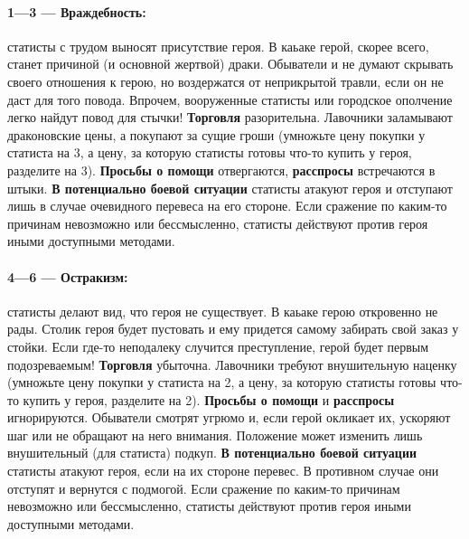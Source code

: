 \paragraph{1—3 — Враждебность:} статисты с трудом выносят присутствие героя. В каьаке герой, скорее всего, станет причиной (и основной жертвой) драки. Обыватели и не думают скрывать своего отношения к герою, но воздержатся от неприкрытой травли, если он не даст для того повода. Впрочем, вооруженные статисты или городское ополчение легко найдут повод для стычки!
\newline
\textbf{Торговля} разорительна. Лавочники заламывают драконовские цены, а покупают за сущие гроши (умножьте цену покупки у статиста на 3, а цену, за которую статисты готовы что-то купить у героя, разделите на 3).
\newline
\textbf{Просьбы о помощи} отвергаются, \textbf{расспросы} встречаются в штыки.
\newline
\textbf{В потенциально боевой ситуации} статисты атакуют героя и отступают лишь в случае очевидного перевеса на его стороне. Если сражение по каким-то причинам невозможно или бессмысленно, статисты действуют против героя иными доступными методами.
\paragraph{4—6 — Остракизм:} статисты делают вид, что героя не существует. В каьаке герою откровенно не рады. Столик героя будет пустовать и ему придется самому забирать свой заказ у стойки. Если где-то неподалеку случится преступление, герой будет первым подозреваемым!
\newline
\textbf{Торговля} убыточна. Лавочники требуют внушительную наценку (умножьте цену покупки у статиста на 2, а цену, за которую статисты готовы что-то купить у героя, разделите на 2).
\newline
\textbf{Просьбы о помощи} и \textbf{расспросы} игнорируются. Обыватели смотрят угрюмо и, если герой окликает их, ускоряют шаг или не обращают на него внимания. Положение может изменить лишь внушительный (для статиста) подкуп.
\newline
\textbf{В потенциально боевой ситуации} статисты атакуют героя, если на их стороне перевес. В противном случае они отступят и вернутся с подмогой. Если сражение по каким-то причинам невозможно или бессмысленно, статисты действуют против героя иными доступными методами.
